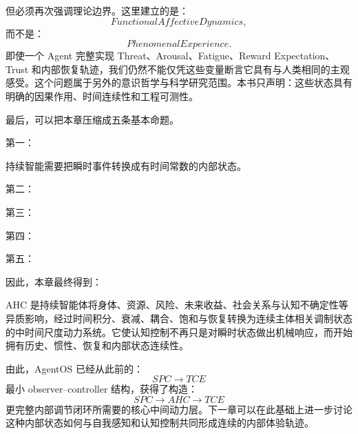 但必须再次强调理论边界。这里建立的是：
\[
FunctionalAffectiveDynamics,
\]
而不是：
\[
PhenomenalExperience.
\]
即使一个 Agent 完整实现 Threat、Arousal、Fatigue、Reward Expectation、Trust 和内部恢复轨迹，我们仍然不能仅凭这些变量断言它具有与人类相同的主观感受。这个问题属于另外的意识哲学与科学研究范围。本书只声明：这些状态具有明确的因果作用、时间连续性和工程可测性。

最后，可以把本章压缩成五条基本命题。

第一：
\begin{statementbox}
\centering
{}
\end{statementbox}
持续智能需要把瞬时事件转换成有时间常数的内部状态。

第二：
\begin{statementbox}
\centering
{}
\end{statementbox}

第三：
\begin{statementbox}
\centering
{}
\end{statementbox}

第四：
\begin{statementbox}
\centering
{}
\end{statementbox}

第五：
\begin{statementbox}
\centering
{}
\end{statementbox}

因此，本章最终得到：

\begin{conclusion}
AHC 是持续智能体将身体、资源、风险、未来收益、社会关系与认知不确定性等异质影响，经过时间积分、衰减、耦合、饱和与恢复转换为连续主体相关调制状态的中时间尺度动力系统。它使认知控制不再只是对瞬时状态做出机械响应，而开始拥有历史、惯性、恢复和内部状态连续性。
\end{conclusion}

由此，AgentOS 已经从此前的：
\[
SPC\rightarrow TCE
\]
最小 observer--controller 结构，获得了构造：
\[
SPC\rightarrow AHC\rightarrow TCE
\]
更完整内部调节闭环所需要的核心中间动力层。下一章可以在此基础上进一步讨论这种内部状态如何与自我感知和认知控制共同形成连续的内部体验轨迹。
